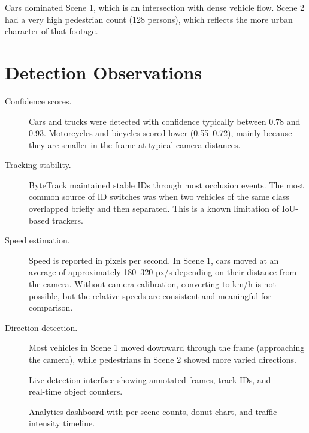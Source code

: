 \documentclass[12pt,a4paper,leqno]{report}
\begin{document}
Cars dominated Scene 1, which is an intersection with dense vehicle flow. Scene 2 had a very high pedestrian count (128 persons), which reflects the more urban character of that footage.

\section{Detection Observations}

\begin{description}
  \item[Confidence scores.] Cars and trucks were detected with confidence typically between 0.78 and 0.93. Motorcycles and bicycles scored lower (0.55--0.72), mainly because they are smaller in the frame at typical camera distances.

  \item[Tracking stability.] ByteTrack maintained stable IDs through most occlusion events. The most common source of ID switches was when two vehicles of the same class overlapped briefly and then separated. This is a known limitation of IoU-based trackers.

  \item[Speed estimation.] Speed is reported in pixels per second. In Scene 1, cars moved at an average of approximately 180--320 px/s depending on their distance from the camera. Without camera calibration, converting to km/h is not possible, but the relative speeds are consistent and meaningful for comparison.

  \item[Direction detection.] Most vehicles in Scene 1 moved downward through the frame (approaching the camera), while pedestrians in Scene 2 showed more varied directions.
\end{description}

\begin{figure}[H]
  \centering
  \caption{Live detection interface showing annotated frames, track IDs, and real-time object counters.}
  \label{fig:app}
\end{figure}

\begin{figure}[H]
  \centering
  \caption{Analytics dashboard with per-scene counts, donut chart, and traffic intensity timeline.}
  \label{fig:dashboard}
\end{figure}
\end{document}
